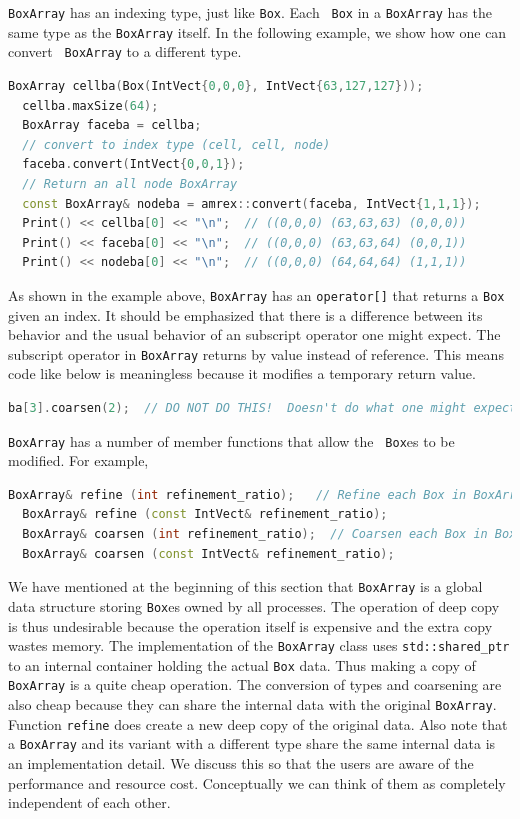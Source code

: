 {{\tt BoxArray} has an indexing type, just like {\tt Box}.  Each {\tt
  Box} in a {\tt BoxArray} has the same type as the {\tt BoxArray}
itself.  In the following example, we show how one can convert {\tt
  BoxArray} to a different type. 
\begin{lstlisting}[language=cpp]
  BoxArray cellba(Box(IntVect{0,0,0}, IntVect{63,127,127}));
  cellba.maxSize(64);
  BoxArray faceba = cellba;
  // convert to index type (cell, cell, node)
  faceba.convert(IntVect{0,0,1});
  // Return an all node BoxArray
  const BoxArray& nodeba = amrex::convert(faceba, IntVect{1,1,1});
  Print() << cellba[0] << "\n";  // ((0,0,0) (63,63,63) (0,0,0))
  Print() << faceba[0] << "\n";  // ((0,0,0) (63,63,64) (0,0,1))  
  Print() << nodeba[0] << "\n";  // ((0,0,0) (64,64,64) (1,1,1))
\end{lstlisting}

As shown in the example above, {\tt BoxArray} has an {\tt operator[]}
that returns a {\tt Box} given an index.  It should be emphasized that
there is a difference between its behavior and the usual behavior of
an subscript operator one might expect.  The subscript operator in
{\tt BoxArray} returns by value instead of reference.  This means code
like below is meaningless because it modifies a temporary return
value. 
\begin{lstlisting}[language=cpp]
  ba[3].coarsen(2);  // DO NOT DO THIS!  Doesn't do what one might expect.
\end{lstlisting}

{\tt BoxArray} has a number of member functions that allow the {\tt
  Box}es to be modified.  For example,
\begin{lstlisting}[language=cpp]
  BoxArray& refine (int refinement_ratio);   // Refine each Box in BoxArray
  BoxArray& refine (const IntVect& refinement_ratio);
  BoxArray& coarsen (int refinement_ratio);  // Coarsen each Box in BoxArray
  BoxArray& coarsen (const IntVect& refinement_ratio);
\end{lstlisting}

We have mentioned at the beginning of this section that {\tt BoxArray}
is a global data structure storing {\tt Box}es owned by all processes.
The operation of deep copy is thus undesirable because the operation
itself is expensive and the extra copy wastes memory.  The
implementation of the {\tt BoxArray} class uses {\tt std::shared\_ptr}
to an internal container holding the actual {\tt Box} data.  Thus
making a copy of {\tt BoxArray} is a quite cheap operation.  The
conversion of types and coarsening are also cheap because they can
share the internal data with the original {\tt BoxArray}.  Function
{\tt refine} does create a new deep copy of the original data.  Also
note that a {\tt BoxArray} and its variant with a different type share
the same internal data is an implementation detail.  We discuss this
so that the users are aware of the performance and resource cost.
Conceptually we can think of them as completely independent of each
other.

}
